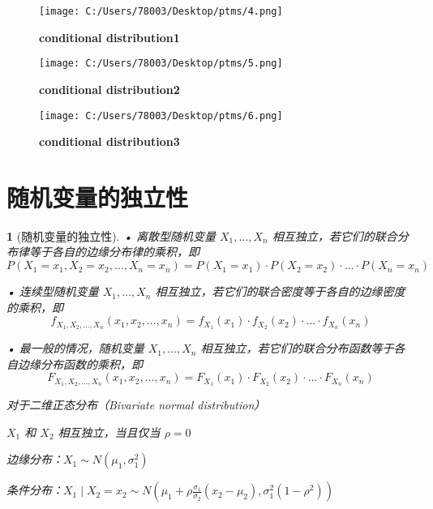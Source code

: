 \documentclass[UTF8]{report}
\theoremstyle{MyLineTheoremStyle} %
\theoremstyle{MyBlockTheoremStyle} %
\theoremstyle{MySubsubsectionStyle} %
\newtheorem{definition}{}
\begin{document}
\begin{figure}[ht]
    \centering
    \texttt{[image: C:/Users/78003/Desktop/ptms/4.png]}
    \caption{\textbf{conditional distribution1}}
    \label{fig:conditional distribution1}
\end{figure}

\begin{figure}[ht]
    \centering
    \texttt{[image: C:/Users/78003/Desktop/ptms/5.png]}
    \caption{\textbf{conditional distribution2}}
    \label{fig:conditional distribution2}
\end{figure}

\begin{figure}[ht]
    \centering
    \texttt{[image: C:/Users/78003/Desktop/ptms/6.png]}
    \caption{\textbf{conditional distribution3}}
    \label{fig:conditional distribution3}
\end{figure}

\cleardoublepage

\section{随机变量的独立性}
\begin{definition}[随机变量的独立性]
    • 离散型随机变量 \(X_1, \ldots, X_n\) 相互独立，若它们的联合分布律等于各自的边缘分布律的乘积，即
    \[
    P(X_1 = x_1, X_2 = x_2, \ldots, X_n = x_n) = P(X_1 = x_1) \cdot P(X_2 = x_2) \cdot \ldots \cdot P(X_n = x_n)
    \]\par
    • 连续型随机变量 \(X_1, \ldots, X_n\) 相互独立，若它们的联合密度等于各自的边缘密度的乘积，即
    \[
    f_{X_1, X_2, \ldots, X_n}(x_1, x_2, \ldots, x_n) = f_{X_1}(x_1) \cdot f_{X_2}(x_2) \cdot \ldots \cdot f_{X_n}(x_n)
    \]\par
    • 最一般的情况，随机变量 \(X_1, \ldots, X_n\) 相互独立，若它们的联合分布函数等于各自边缘分布函数的乘积，即
    \[
    F_{X_1, X_2, \ldots, X_n}(x_1, x_2, \ldots, x_n) = F_{X_1}(x_1) \cdot F_{X_2}(x_2) \cdot \ldots \cdot F_{X_n}(x_n)
    \]\par
    对于二维正态分布（Bivariate normal distribution）\par
    \(X_1\) 和 \(X_2\) 相互独立，当且仅当 \(\rho = 0\)\par
    边缘分布：\(X_1 \sim N(\mu_1, \sigma_1^2)\)\par
    条件分布：\(X_1 \mid X_2 = x_2 \sim N\left(\mu_1 + \rho \frac{\sigma_1}{\sigma_2}(x_2 - \mu_2), \sigma_1^2(1 - \rho^2)\right)\)
\end{definition}
\end{document}
